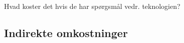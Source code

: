 Hvad koster det hvis de har spørgsmål vedr. teknologien? 



\subsection{Indirekte omkostninger}















\begin{comment}
Hvad koster et Fitbit Flex? 
Hvilke besparelser tilbydes der så sundhedsektoren? 

Hvad koster det så at introducere patienterne til teknologien? 
	Hvad dækker den her introduktion minimum over, for at kunne anvende armbåndet? (Anvendelse af app og hvordan den skal oplades.)
	
Hvad koster det hvis de har spørgsmål vedr. teknologien? 


Langsigtet omkostninger - hvis behandlingen hjælper/ikke hjælper
- Besparelser vedr. medicinering 
- Besparelser vedr. ambulant forløb 
- Forebyggelse af behandlingsresistent hypertension = $$$$



EVT: Dags-takster i sekundær sektor (Ambulant).



En model i almen praktsis for implementeringen af aktivitetsarmbånd?

Honorartabel = \citep{honorartabel2016}
\end{comment}